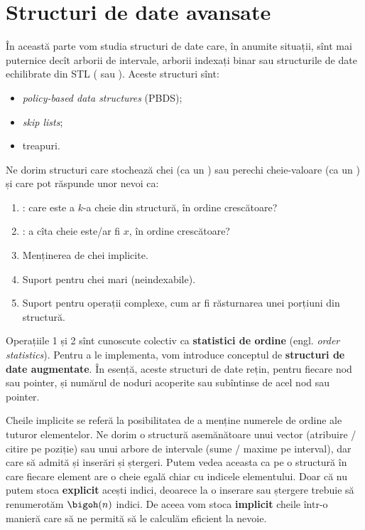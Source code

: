 \part{Structuri de date avansate}

În această parte vom studia structuri de date care, în anumite situații, sînt mai puternice decît arborii de intervale, arborii indexați binar sau structurile de date echilibrate din STL ( sau ). Aceste structuri sînt:

\begin{itemize}
  \item \textit{policy-based data structures} (PBDS);
  \item \textit{skip lists};
  \item treapuri.
\end{itemize}

Ne dorim structuri care stochează chei (ca un ) sau perechi cheie-valoare (ca un ) și care pot răspunde unor nevoi ca:

\begin{enumerate}
  \item {}: care este a $k$-a cheie din structură, în ordine crescătoare?
  \item {}: a cîta cheie este/ar fi $x$, în ordine crescătoare?
  \item Menținerea de chei implicite.
  \item Suport pentru chei mari (neindexabile).
  \item Suport pentru operații complexe, cum ar fi răsturnarea unei porțiuni din structură.
\end{enumerate}

Operațiile 1 și 2 sînt cunoscute colectiv ca \textbf{statistici de ordine} (engl. \textit{order statistics}). Pentru a le implementa, vom introduce conceptul de \textbf{structuri de date augmentate}. În esență, aceste structuri de date rețin, pentru fiecare nod sau pointer, și numărul de noduri acoperite sau subîntinse de acel nod sau pointer.

Cheile implicite se referă la posibilitatea de a menține numerele de ordine ale tuturor elementelor. Ne dorim o structură asemănătoare unui vector (atribuire / citire pe poziție) sau unui arbore de intervale (sume / maxime pe interval), dar care să admită și inserări și ștergeri. Putem vedea aceasta ca pe o structură în care fiecare element are o cheie egală chiar cu indicele elementului. Doar că nu putem stoca \textbf{explicit} acești indici, deoarece la o inserare sau ștergere trebuie să renumerotăm $\bigoh(n)$ indici. De aceea vom stoca \textbf{implicit} cheile într-o manieră care să ne permită să le calculăm eficient la nevoie.

